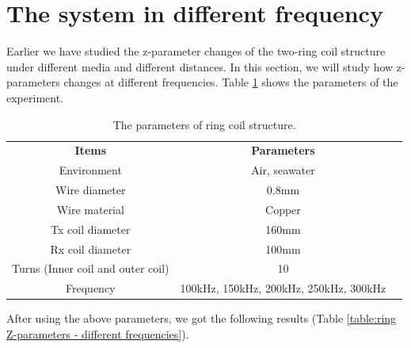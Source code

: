 \section{The system in different frequency}
Earlier we have studied the z-parameter changes of the two-ring coil structure under different media and different distances. In this section, we will study how z-parameters changes at different frequencies. Table \ref{table:ring coil parameters - different frequencies} shows the parameters of the experiment.

\begin{table}[!t]
    \centering
    \caption{The parameters of ring coil structure.}
    \begin{tabular}{ c|cc }
        \thickhline
        \textbf{Items}                    & \textbf{Parameters}                    \\
        \thickhline
        Environment                       & Air, seawater                          \\ \hline
        Wire diameter                     & 0.8mm                                  \\ \hline
        Wire material                     & Copper                                 \\
        \hline
        Tx coil diameter                  & 160mm                                  \\ \hline
        Rx coil diameter                  & 100mm                                  \\ \hline
        Turns (Inner coil and outer coil) & 10                                     \\ \hline
        Frequency                         & 100kHz, 150kHz, 200kHz, 250kHz, 300kHz \\ \hline
    \end{tabular}
    \label{table:ring coil parameters - different frequencies}
\end{table}

After using the above parameters, we got the following results (Table \ref{table:ring Z-parameters - different frequencies}).

